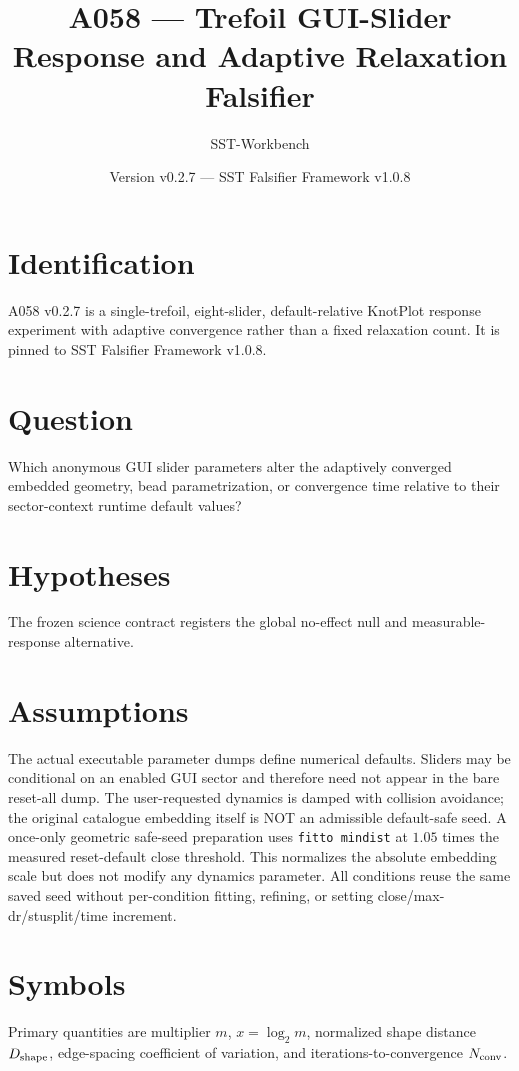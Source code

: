 \documentclass[11pt,a4paper]{article}
\begin{document}
\title{A058 --- Trefoil GUI-Slider Response and Adaptive Relaxation Falsifier}
\author{SST-Workbench}\date{Version v0.2.7 --- SST Falsifier Framework v1.0.8}\maketitle
{}
\section{Identification}
A058 v0.2.7 is a single-trefoil, eight-slider, default-relative KnotPlot response experiment with adaptive convergence rather than a fixed relaxation count. It is pinned to SST Falsifier Framework v1.0.8.
\section{Question}
Which anonymous GUI slider parameters alter the adaptively converged embedded geometry, bead parametrization, or convergence time relative to their sector-context runtime default values?
\section{Hypotheses}
The frozen science contract registers the global no-effect null and measurable-response alternative.
\section{Assumptions}
The actual executable parameter dumps define numerical defaults. Sliders may be conditional on an enabled GUI sector and therefore need not appear in the bare reset-all dump. The user-requested dynamics is damped with collision avoidance; the original catalogue embedding itself is NOT an admissible default-safe seed. A once-only geometric safe-seed preparation uses \texttt{fitto mindist} at $1.05$ times the measured reset-default close threshold. This normalizes the absolute embedding scale but does not modify any dynamics parameter. All conditions reuse the same saved seed without per-condition fitting, refining, or setting close/max-dr/stusplit/time increment.
\section{Symbols}
Primary quantities are multiplier $m$, $x=\log_2m$, normalized shape distance $D_{\rm shape}$, edge-spacing coefficient of variation, and iterations-to-convergence $N_{\rm conv}$.
\end{document}
